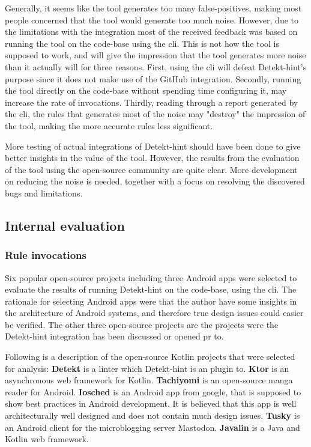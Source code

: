 \documentclass[pdftex,10pt,b5paper,twoside]{report}
\begin{document}
Generally, it seems like the tool generates too many false-positives, making most people concerned that the tool would generate too much noise. However, due to the limitations with the integration most of the received feedback was based on running the tool on the code-base using the \gls{cli}. This is not how the tool is supposed to work, and will give the impression that the tool generates more noise than it actually will for three reasons. First, using the \gls{cli} will defeat Detekt-hint's purpose since it does not make use of the GitHub integration. Secondly, running the tool directly on the code-base without spending time configuring it, may increase the rate of invocations. Thirdly, reading through a report generated by the \gls{cli}, the rules that generates most of the noise may "destroy" the impression of the tool, making the more accurate rules less significant.

More testing of actual integrations of Detekt-hint should have been done to give better insights in the value of the tool. However, the results from the evaluation of the tool using the open-source community are quite clear. More development on reducing the noise is needed, together with a focus on resolving the discovered bugs and limitations.
 
\subsection{Internal evaluation}
\label{evaluation-internal}
\subsubsection{Rule invocations}
Six popular open-source projects including three Android apps were selected to evaluate the results of running Detekt-hint on the code-base, using the \gls{cli}. The rationale for selecting Android apps were that the author have some insights in the architecture of Android systems, and therefore true design issues could easier be verified. The other three open-source projects are the projects were the Detekt-hint integration has been discussed or opened \gls{pr} to. 


Following is a description of the open-source Kotlin projects that were selected for analysis: \textbf{Detekt} is a linter which Detekt-hint is an plugin to. \textbf{Ktor} is an asynchronous web framework for Kotlin. \textbf{Tachiyomi} is an open-source manga reader for Android. \textbf{Iosched} is an Android app from google, that is supposed to show best practices in Android development. It is believed that this app is well architecturally well designed and does not contain much design issues. \textbf{Tusky} is an Android client for the microblogging server Mastodon. \textbf{Javalin} is a Java and Kotlin web framework. 
\end{document}
